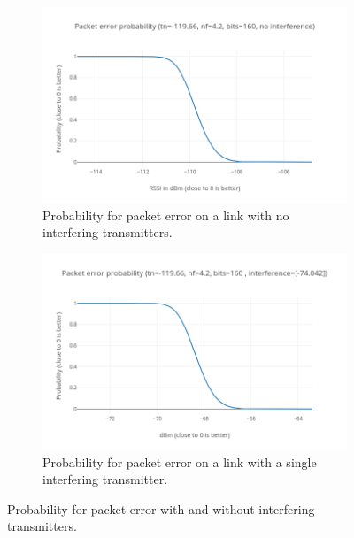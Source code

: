 \begin{figure}[H]
    \centering
    \begin{subfigure}[t]{.9\textwidth}
        \includegraphics[width=\linewidth]{figures/pep/pep_0_interference.png}
        \caption{Probability for packet error on a link with no interfering transmitters.}
        \label{figure:pepegraph}
    \end{subfigure}
    \begin{subfigure}[t]{.9\textwidth}
        \includegraphics[width=\linewidth]{figures/pep/pep_1_interference.png}
        \caption{Probability for packet error on a link with a single interfering transmitter.}
        \label{figure:pepegraph1}
    \end{subfigure}
    \caption{Probability for packet error with and without interfering transmitters.}
    \label{figure:pepegraphs}
\end{figure}

